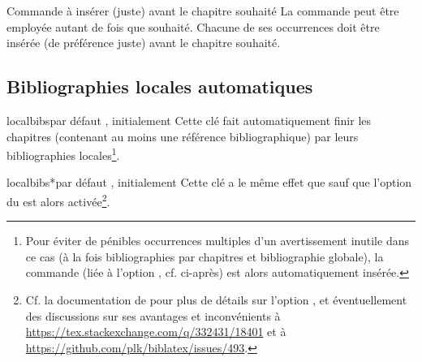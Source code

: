 \begin{dbwarning}{Commande \protect{} à insérer (juste)
    avant le chapitre souhaité}{}
  La commande  peut être employée autant de fois que
  souhaité. Chacune de ses occurrences doit être insérée (de préférence juste)
  avant le chapitre souhaité.
\end{dbwarning}

\subsection{Bibliographies locales automatiques}
\label{sec-localbibs}%
%

%
%

\begin{docKey}[][doc new=2016-10-30]{localbibs}{}{par défaut ,
    initialement }
  Cette clé fait automatiquement finir les chapitres (contenant au moins une
  référence bibliographique) par leurs bibliographies locales\footnote{Pour
    éviter de pénibles occurrences multiples d'un avertissement inutile dans ce
    cas (à la fois bibliographies par chapitres et bibliographie globale), la
    commande  (liée
    à l'option , cf. ci-après) est alors
    automatiquement insérée.}.
\end{docKey}

\begin{docKey}[][doc new=2016-10-30]{localbibs*}{}{par défaut ,
    initialement }
  Cette clé a le même effet que  sauf que l'option
   du  est alors
  activée\footnote{\label{defernumbers}Cf. la documentation de
     pour plus de détails sur l'option
    , et éventuellement des discussions sur ses
    avantages et inconvénients
    à \url{https://tex.stackexchange.com/q/332431/18401} et
    à \url{https://github.com/plk/biblatex/issues/493}.}.
\end{docKey}


